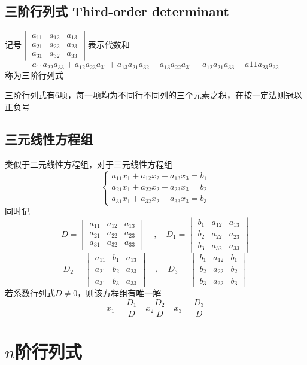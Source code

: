 \documentclass[UTF8]{ctexart}
\begin{document}
\subsection*{三阶行列式 Third-order determinant}
记号$\displaystyle\begin{vmatrix}
a_{11}&a_{12}&a_{13}\\
a_{21}&a_{22}&a_{23}\\
a_{31}&a_{32}&a_{33}
\end{vmatrix}$表示代数和
\[a_{11}a_{22}a_{33}+a_{12}a_{23}a_{31}+a_{13}a_{21}a_{32}
-a_{13}a_{22}a_{31}-a_{12}a_{21}a_33-a{11}a_{23}a_{32}\]
称为三阶行列式

三阶行列式有6项，每一项均为不同行不同列的三个元素之积，在按一定法则冠以正负号

\subsection*{三元线性方程组}
类似于二元线性方程组，对于三元线性方程组
\[
\left\{
\begin{aligned}
  a_{11}x_1+a_{12}x_2+a_{13}x_3=b_1\\
  a_{21}x_1+a_{22}x_2+a_{23}x_3=b_2\\
  a_{31}x_1+a_{32}x_2+a_{33}x_3=b_3
\end{aligned}
\right.
\]
同时记
\[
D=
\begin{vmatrix}
  a_{11}&a_{12}&a_{13}\\
  a_{21}&a_{22}&a_{23}\\
  a_{31}&a_{32}&a_{33}
\end{vmatrix}
\quad,\quad
D_1=
\begin{vmatrix}
  b_1&a_{12}&a_{13}\\
  b_2&a_{22}&a_{23}\\
  b_3&a_{32}&a_{33}
\end{vmatrix}
\]
\[
D_2=
\begin{vmatrix}
  a_{11}&b_1&a_{13}\\
  a_{21}&b_2&a_{23}\\
  a_{31}&b_3&a_{33}
\end{vmatrix}
\quad,\quad
D_3=
\begin{vmatrix}
  b_1&a_{12}&b_1\\
  b_2&a_{22}&b_2\\
  b_3&a_{32}&b_3
\end{vmatrix}
\]
若系数行列式$D\ne0$，则该方程组有唯一解
\[x_1=\frac{D_1}{D}\quad x_2\frac{D_2}{D}\quad x_3=\frac{D_3}{D}\]


\section*{$n$阶行列式}
\end{document}
